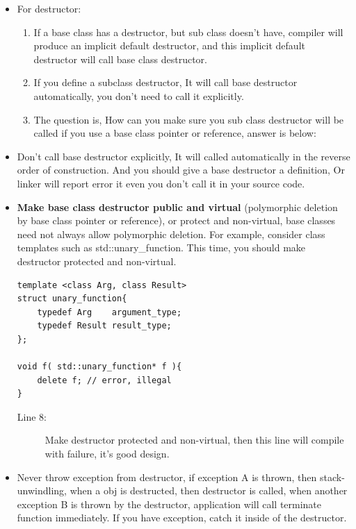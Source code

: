 \documentclass[a4paper,11pt,twoside]{book}
\begin{document}
\begin{itemize}
	\item For destructor:
	\begin{enumerate}
		\item If a base class has a destructor, but sub class doesn't have,  compiler will produce an implicit default destructor, and this implicit default destructor will call base class destructor.
		
		\item If you define a subclass destructor, It will call base destructor automatically, you don't need to call it explicitly.
		
		\item The question is, How can you make sure you sub class destructor will be called if you use a base class pointer or reference, answer is below:
	\end{enumerate}
	
	\item Don't call base destructor explicitly, It will called automatically in the reverse order of construction.  And you should give a base destructor a definition, Or linker will report error it even you don't call it in your source code.
	
	\item \textbf{Make base class destructor public and virtual} (polymorphic deletion by base class pointer or reference), or protect and non-virtual, base classes need not always allow polymorphic deletion. For example, consider class templates such as std::unary\_function. This time, you should make destructor protected and non-virtual.
\begin{lstlisting}[numbers=none]
template <class Arg, class Result>
struct unary_function{
	typedef Arg    argument_type;
	typedef Result result_type;
};
	
void f( std::unary_function* f ){
	delete f; // error, illegal
}
\end{lstlisting}
\begin{description}
	\item[Line 8:] Make destructor protected and non-virtual, then this line will compile with failure, it's good design. 
\end{description}
	
	\item Never throw exception from destructor, if exception A is thrown, then stack-unwindling, when a obj is destructed, then destructor is called, when another exception B is thrown by the destructor, application will call terminate function immediately.  If you have exception, catch it inside of the destructor.
	
\end{itemize}
\end{document}
